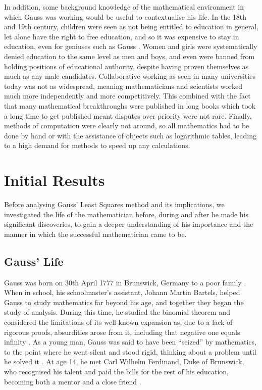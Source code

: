 \documentclass{article}
\begin{document}
In addition, some background knowledge of the mathematical environment in which Gauss was working would be useful to contextualise his life. In the 18th and 19th century, children were seen as not being entitled to education in general, let alone have the right to free education, and so it was expensive to stay in education, even for geniuses such as Gauss \cite{menofmaths}. Women and girls were systematically denied education to the same level as men and boys, and even were banned from holding positions of educational authority, despite having proven themselves as much as any male candidates. Collaborative working as seen in many universities today was not as widespread, meaning mathematicians and scientists worked much more independently and more competitively. This combined with the fact that many mathematical breakthroughs were published in long books which took a long time to get published meant disputes over priority were not rare. Finally, methods of computation were clearly not around, so all mathematics had to be done by hand or with the assistance of objects such as logarithmic tables, leading to a high demand for methods to speed up any calculations. 


\section{Initial Results}

Before analysing Gauss' Least Squares method and its implications, we investigated the life of the mathematician before, during and after he made his significant discoveries, to gain a deeper understanding of his importance and the manner in which the successful mathematician came to be. 
\subsection{Gauss' Life}

Gauss was born on 30th April 1777 in Brunswick, Germany to a poor family \cite{menofmaths}. When in school, his schoolmaster’s assistant, Johann Martin Bartels, helped Gauss to study mathematics far beyond his age, and together they began the study of analysis. During this time, he studied the binomial theorem and considered the limitations of its well-known expansion as, due to a lack of rigorous proofs, absurdities arose from it, including that negative one equals infinity \cite{menofmaths}. As a young man, Gauss was said to have been “seized” by mathematics, to the point where he went silent and stood rigid, thinking about a problem until he solved it \cite{menofmaths}. At age 14, he met Carl Wilhelm Ferdinand, Duke of Brunswick, who recognised his talent and paid the bills for the rest of his education, becoming both a mentor and a close friend \cite{menofmaths}.
\end{document}
